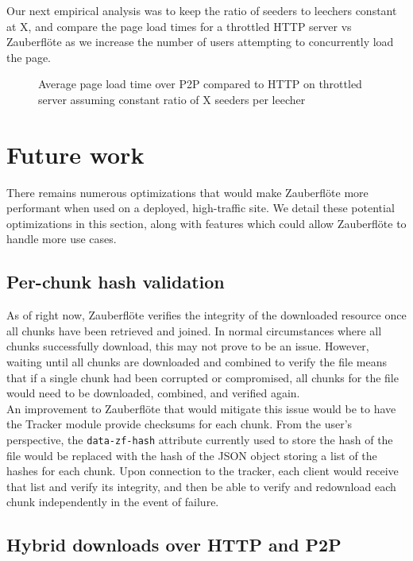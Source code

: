\documentclass[letterpaper,twocolumn,10pt]{article}
\newcommand{\zbf}{Zauberfl\"{o}te\xspace}
\begin{document}
Our next empirical analysis was to keep the ratio of seeders to leechers constant at X,
and compare the page load times for a throttled HTTP server vs \zbf as we increase the
number of users attempting to concurrently load the page.

\begin{figure}[h]
\caption{Average page load time over P2P compared to HTTP on throttled server assuming
constant ratio of X seeders per leecher}
\end{figure}

\section{Future work}

There remains numerous optimizations that would make \zbf more performant
when used on a deployed, high-traffic site. We detail these potential optimizations
in this section, along with features which could allow \zbf to handle more use cases.

\subsection{Per-chunk hash validation}
As of right now, \zbf verifies the integrity of the downloaded resource once all
chunks have been retrieved and joined. In normal circumstances where all chunks
successfully download, this may not prove to be an issue. However, waiting until
all chunks are downloaded and combined to verify the file means that if a single
chunk had been corrupted or compromised, all chunks for the file would need to be
downloaded, combined, and verified again. \\

An improvement to \zbf that would mitigate this issue would be to have the Tracker
module provide checksums for each chunk. From the user's perspective, the
\texttt{data-zf-hash} attribute currently used to store the hash of the file
would be replaced with the hash of the JSON object storing a list of the hashes
for each chunk. Upon connection to the tracker, each client would receive that
list and verify its integrity, and then be able to verify and redownload each chunk
independently in the event of failure.

\subsection{Hybrid downloads over HTTP and P2P}
\end{document}
